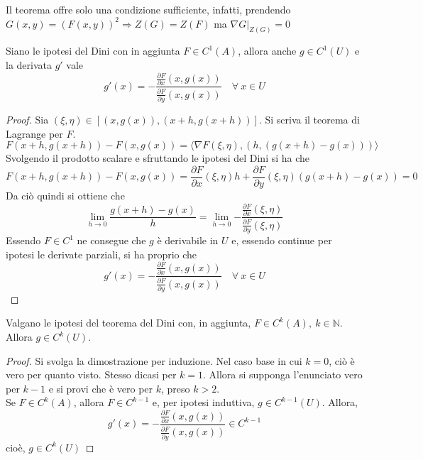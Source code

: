 \begin{oss}
    Il teorema offre solo una condizione sufficiente, infatti, prendendo $G(x,y)=(F(x,y))^2 \Rightarrow Z(G)=Z(F)$ ma $\nabla G \big|_{Z(G)}=0$
\end{oss}
\begin{theorem}
Siano le ipotesi del Dini con in aggiunta $F \in C^1(A)$, allora anche $g \in C^1(U)$ e la derivata $g'$ vale
\begin{equation}
    g'(x)=-\frac{\frac{\partial{F}}{\partial{x}}(x, g(x))}{\frac{\partial{F}}{\partial{y}}(x, g(x))} \quad \forall\ x \in U
\end{equation}
\end{theorem}
\begin{proof}
Sia $(\xi, \eta) \in \left[(x, g(x)), (x+h, g(x+h)) \right]$.
Si scriva il teorema di Lagrange per $F$.
\begin{equation}
    F(x+h, g(x+h))-F(x, g(x)) =\langle \nabla F (\xi, \eta), (h, (g(x+h)-g(x))) \rangle
\end{equation}
Svolgendo il prodotto scalare e sfruttando le ipotesi del Dini si ha che
\begin{equation}
    F(x+h, g(x+h))-F(x, g(x))= \frac{\partial {F}}{\partial{x}}(\xi, \eta) h + \frac{\partial {F}}{\partial{y}}(\xi, \eta) (g(x+h)-g(x))=0
\end{equation}
    Da ciò quindi si ottiene che
    \begin{equation}
        \lim_{h \to 0}{\frac{g(x+h)-g(x)}{h}}=\lim_{h \to 0}{-\frac{\frac{\partial {F}}{\partial{x}}(\xi, \eta)}{\frac{\partial {F}}{\partial{y}}(\xi, \eta)}}
    \end{equation}
Essendo $F \in C^1$ ne consegue che $g$ è derivabile in $U$ e, essendo continue per ipotesi le derivate parziali, si ha proprio che
\begin{equation}
    g'(x)=-\frac{\frac{\partial{F}}{\partial{x}}(x, g(x))}{\frac{\partial{F}}{\partial{y}}(x, g(x))} \quad \forall\ x \in U
\end{equation}
\end{proof}
\begin{corollary}
    Valgano le ipotesi del teorema del Dini con, in aggiunta, $F \in C^k(A),\ k \in \mathbb{N}$. Allora $g \in C^k(U)$.
\end{corollary}
\begin{proof}
    Si svolga la dimostrazione per induzione.
    Nel caso base in cui $k=0$, ciò è vero per quanto visto. Stesso dicasi per $k=1$. Allora si supponga l'enunciato vero per $k-1$ e si provi che è vero per $k$, preso $k>2$.\\
    Se $F \in C^k(A)$, allora $F \in C^{k-1}$ e, per ipotesi induttiva, $g \in C^{k-1}(U)$. Allora, 
    \begin{equation}
         g'(x)=-\frac{\frac{\partial{F}}{\partial{x}}(x, g(x))}{\frac{\partial{F}}{\partial{y}}(x, g(x))} \in C^{k-1}
    \end{equation}
    cioè, $g \in C^k(U)$
\end{proof}
